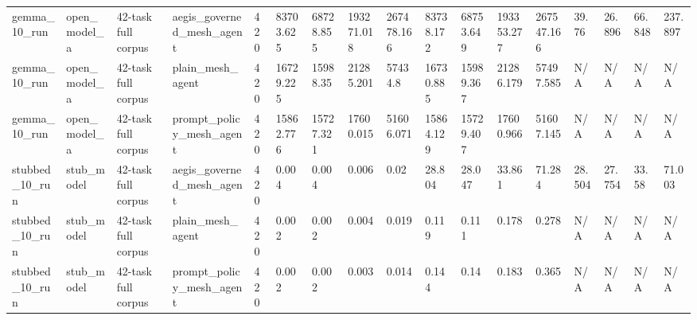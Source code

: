 \begin{tabular}{lllllllllllllllll}
gemma\_10\_run & open\_model\_a & 42-task full corpus & aegis\_governed\_mesh\_agent & 420 & 83703.625 & 68728.855 & 193271.018 & 267478.166 & 83738.172 & 68753.649 & 193353.277 & 267547.166 & 39.76 & 26.896 & 66.848 & 237.897 \\
gemma\_10\_run & open\_model\_a & 42-task full corpus & plain\_mesh\_agent & 420 & 16729.225 & 15988.35 & 21285.201 & 57434.8 & 16730.885 & 15989.367 & 21286.179 & 57497.585 & N/A & N/A & N/A & N/A \\
gemma\_10\_run & open\_model\_a & 42-task full corpus & prompt\_policy\_mesh\_agent & 420 & 15862.776 & 15727.321 & 17600.015 & 51606.071 & 15864.129 & 15729.407 & 17600.966 & 51607.145 & N/A & N/A & N/A & N/A \\
stubbed\_10\_run & stub\_model & 42-task full corpus & aegis\_governed\_mesh\_agent & 420 & 0.004 & 0.004 & 0.006 & 0.02 & 28.804 & 28.047 & 33.861 & 71.284 & 28.504 & 27.754 & 33.58 & 71.003 \\
stubbed\_10\_run & stub\_model & 42-task full corpus & plain\_mesh\_agent & 420 & 0.002 & 0.002 & 0.004 & 0.019 & 0.119 & 0.111 & 0.178 & 0.278 & N/A & N/A & N/A & N/A \\
stubbed\_10\_run & stub\_model & 42-task full corpus & prompt\_policy\_mesh\_agent & 420 & 0.002 & 0.002 & 0.003 & 0.014 & 0.144 & 0.14 & 0.183 & 0.365 & N/A & N/A & N/A & N/A \\
 \hline
\end{tabular}
